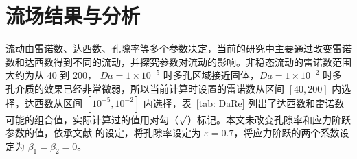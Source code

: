 \chapter{流场结果与分析}\label{chap: flow pattern}

流动由雷诺数、达西数、孔隙率等多个参数决定，当前的研究中主要通过改变雷诺数和达西数得到不同的流动，并探究参数对流动的影响。非稳态流动的雷诺数范围大约为从 40 到 200， $Da=1\times 10^{-5}$ 时多孔区域接近固体，$Da=1\times 10^{-2}$ 时多孔介质的效果已经非常微弱，所以当前计算时设置的雷诺数从区间 $[40,200]$ 内选择，达西数从区间 $[10^{-5},10^{-2}]$ 内选择，表~\ref{tab: DaRe} 列出了达西数和雷诺数可能的组合值，实际计算过的值用对勾（$\surd$）标记。本文未改变孔隙率和应力阶跃参数的值，依承文献  的设定，将孔隙率设定为 $\varepsilon=0.7$，将应力阶跃的两个系数设定为 $\beta_1=\beta_2=0$。

